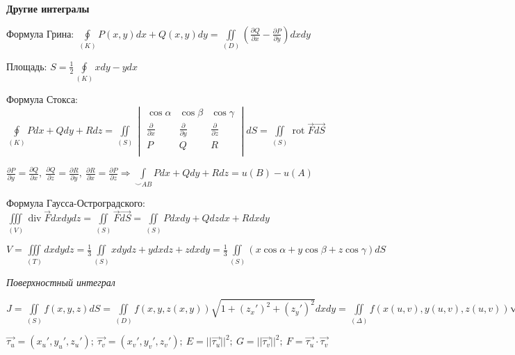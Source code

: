 \begin{center}
    \textbf{Другие интегралы}
\end{center}

Формула Грина: $\displaystyle\oint\limits_{(K)}P(x, y)dx + Q(x, y)dy = \iint\limits_{(D)}\left(\frac{\partial Q}{\partial x} - \frac{\partial P}{\partial y}\right)dxdy$

Площадь: $S = \frac{1}{2}\oint\limits_{(K)}xdy - ydx$

Формула Стокса: $\displaystyle \oint\limits_{(K)} Pdx + Qdy + Rdz = \iint\limits_{(S)}\begin{vmatrix}
    \cos{\alpha} & \cos{\beta} & \cos{\gamma} \\
    \frac{\partial}{\partial{x}} & \frac{\partial}{\partial{y}} & \frac{\partial}{\partial{z}} \\
    P & Q & R \\
\end{vmatrix}dS =  \iint\limits_{(S)} \operatorname{rot}\vec{F} \vec{dS}$ 

$\displaystyle \frac{\partial{P}}{\partial{y}}=\frac{\partial{Q}}{\partial{x}},~ \frac{\partial{Q}}{\partial{z}}=\frac{\partial{R}}{\partial{y}},~ \frac{\partial{R}}{\partial{x}}=\frac{\partial{P}}{\partial{z}} \Rightarrow \int\limits_{\smile{AB}}Pdx+Qdy+Rdz = u(B) - u(A)$

Формула Гаусса-Остроградского: $\displaystyle \iiint\limits_{(V)} \operatorname{div}\vec{F}dxdydz = \iint\limits_{(S)} \vec{F}\vec{dS} = \iint\limits_{(S)}Pdxdy + Qdzdx + Rdxdy$ 

$\displaystyle V = \iiint\limits_{(T)}dxdydz = \frac{1}{3}\iint\limits_{(S)}xdydz+ydxdz+zdxdy = \frac{1}{3}\iint\limits_{(S)}(x\cos{\alpha} + y\cos{\beta} + z\cos{\gamma})dS$

\vspace{2ex}
\textit{Поверхностный интеграл}

$\displaystyle J = \iint\limits_{(S)}f(x, y, z)dS = \iint\limits_{(D)}f(x, y, z(x, y))\sqrt{1+(z_x')^2+(z_y')^2}dxdy = \iint\limits_{(\Delta)}f(x(u,v),y(u,v),z(u,v))\sqrt{EG - F^2}dudv$

$\displaystyle \vec{\tau_u} = (x_u',y_u',z_u'); ~\vec{\tau_v} = (x_v',y_v',z_v'); ~E = ||\vec{\tau_u}||^2; ~G = ||\vec{\tau_v}||^2; ~F = \vec{\tau_u} \cdot \vec{\tau_v}$
























